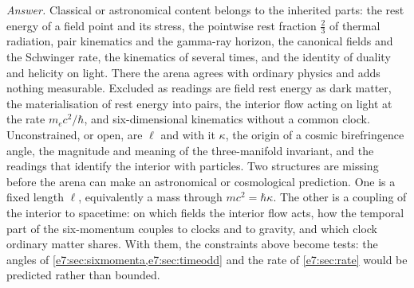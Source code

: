 \emph{Answer.} Classical or astronomical content belongs to the inherited parts: the rest energy of a field point and its stress, the
pointwise rest fraction $\tfrac23$ of thermal radiation, pair kinematics and the gamma-ray horizon, the canonical fields and the Schwinger rate,
the kinematics of several times, and the identity of duality and helicity on light. There the arena agrees with ordinary physics and adds
nothing measurable. Excluded as readings are field rest energy as dark matter, the materialisation of rest energy into pairs, the interior flow
acting on light at the rate $m_ec^2/\hbar$, and six-dimensional kinematics without a common clock. Unconstrained, or open, are $\ell$ and with it
$\kappa$, the origin of a cosmic birefringence angle, the magnitude and meaning of the three-manifold invariant, and the readings that identify
the interior with particles. Two structures are missing before the arena can make an astronomical or cosmological prediction. One is a fixed
length $\ell$, equivalently a mass through $mc^2=\hbar\kappa$. The other is a coupling of the interior to spacetime: on which fields the interior
flow acts, how the temporal part of the six-momentum couples to clocks and to gravity, and which clock ordinary matter shares. With them, the
constraints above become tests: the angles of \cref{e7:sec:sixmomenta,e7:sec:timeodd} and the rate of \cref{e7:sec:rate} would be predicted
rather than bounded.
